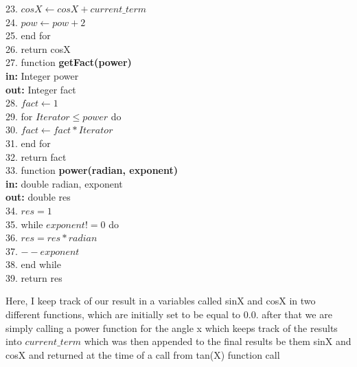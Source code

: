 \documentclass[a4paper, 11pt]{article}
\begin{document}
\begin{algorithm}
\begin{algorithmic}
23. \qquad \STATE $cosX \leftarrow cosX+current\_term$\\
24. \qquad \STATE $pow \leftarrow pow+2$\\
25. end for\\
26. \STATE return cosX \\
27. function \textbf{getFact(power)}\\
\textbf{in: } Integer power\\
\textbf{out: } Integer fact\\
28. \STATE $fact \leftarrow 1$\\
29. for {$Iterator \leq power$} do\\
30. \qquad \STATE $fact \leftarrow fact*Iterator$\\
31. end for\\
32. \STATE return fact\\
33. function \textbf{power(radian, exponent)}\\
\textbf{in: } double radian, exponent\\
\textbf{out: } double res\\
34. \STATE $res = 1$\\
35. while  \STATE $exponent != 0$  do\\
36. \qquad $res = res*radian$ \\
37. \qquad $--exponent$ \\
38. end while \\
39. \STATE return res\\ 
\end{algorithmic}
\end{algorithm}

\newpage
Here, I keep track of our result in a variables called sinX and cosX in two different functions, which are initially set to be equal to 0.0. after that we are simply calling a power function for the angle x which keeps track of the results into $current\_term$ which was then appended to the final results be them sinX and cosX and returned at the time of a call from tan(X) function call\\
\end{document}
